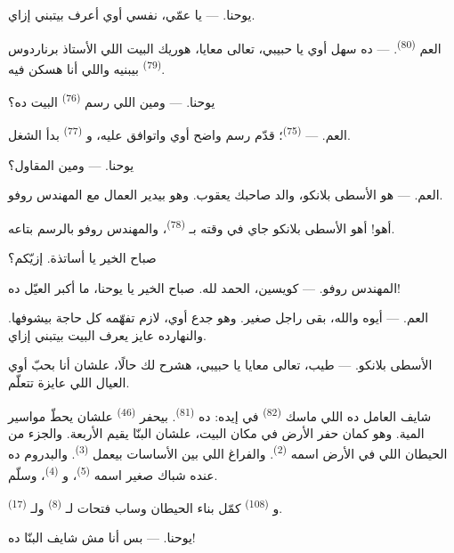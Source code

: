 \textsc{يوحنا}. --- يا عمّي، نفسي أوي أعرف  بيتبني إزاي.

\textsc{العم} \textsuperscript{(80)}. --- ده سهل أوي يا حبيبي، تعالى معايا،
هوريك البيت اللي الأستاذ برناردوس \textsuperscript{(79)} بيبنيه واللي أنا هسكن فيه.

\textsc{يوحنا}. --- ومين اللي رسم  \textsuperscript{(76)} البيت ده؟

\textsc{العم}. ---  \textsuperscript{(75)}؛ قدّم رسم واضح
أوي واتوافق عليه، و \textsuperscript{(77)} بدأ الشغل.

\textsc{يوحنا}. --- ومين المقاول؟

\textsc{العم}. --- هو الأسطى بلانكو، والد صاحبك يعقوب. وهو بيدير العمال مع
المهندس روفو.

أهو! أهو الأسطى بلانكو جاي في وقته بـ \textsuperscript{(78)}، والمهندس
روفو بالرسم بتاعه.

صباح الخير يا أساتذة. إزيّكم؟

\textsc{المهندس روفو}. --- كويسين، الحمد لله. صباح الخير يا يوحنا، ما أكبر
العيّل ده!

\textsc{العم}. --- أيوه والله، بقى راجل صغير. وهو جدع أوي، لازم تفهّمه كل حاجة
بيشوفها. والنهارده عايز يعرف البيت بيتبني إزاي.

\VUsaut{3.0mm}

\textsc{الأسطى بلانكو}. --- طيب، تعالى معايا يا حبيبي، هشرح لك حالًا، علشان
أنا بحبّ أوي العيال اللي عايزة تتعلّم.

شايف العامل ده اللي ماسك  \textsuperscript{(82)} في إيده: ده
 \textsuperscript{(81)}. بيحفر  \textsuperscript{(46)} علشان يحطّ
مواسير المية. وهو كمان حفر الأرض في مكان البيت، علشان البنّا يقيم
 الأربعة. والجزء من الحيطان اللي في الأرض اسمه
 \textsuperscript{(2)}. والفراغ اللي بين الأساسات بيعمل
 \textsuperscript{(3)}. والبدروم ده عنده شباك صغير اسمه  \textsuperscript{(5)}، و \textsuperscript{(4)}، وسلّم.

و \textsuperscript{(108)} كمّل بناء الحيطان وساب فتحات لـ
\textsuperscript{(8)} ولـ \textsuperscript{(17)}.

\textsc{يوحنا}. --- بس أنا مش شايف البنّا ده!

